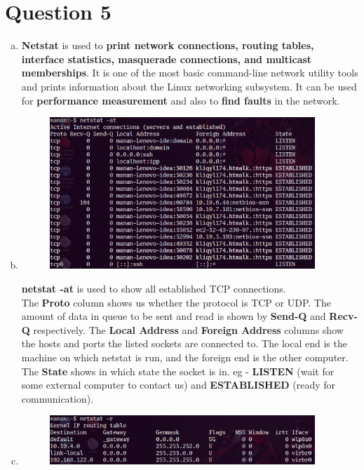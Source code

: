\documentclass[a4paper,10pt]{article}
\newlength{\strutheight}
\begin{document}
\section*{Question 5}
\begin{enumerate}[a)]
	\item \textbf{Netstat} is used to \textbf{print network connections, routing tables, interface statistics, masquerade connections, and multicast memberships}. It is one of the most basic command-line network utility tools and prints information about the Linux networking subsystem. It can be used for \textbf{performance measurement} and also to \textbf{find faults} in the network.
	\item 
	\begin{adjustbox}{valign=T,raise=\strutheight,minipage={\linewidth}}
		\begin{figure}
			\includegraphics[width=10cm]{netstat1.png}
		\end{figure}
		\strut{}
		\textbf{netstat -at} is used to show all established TCP connections. \\
		The \textbf{Proto} column shows us whether the protocol is TCP or UDP. The amount of data in queue to be sent and read is shown by \textbf{Send-Q} and \textbf{Recv-Q} respectively. The \textbf{Local Address} and \textbf{Foreign Address} columns show the hosts and ports the listed sockets are connected to. The local end is the machine on which netstat is run, and the foreign end is the other computer. The \textbf{State} shows in which state the socket is in. eg - \textbf{LISTEN} (wait for some external computer to contact us) and \textbf{ESTABLISHED} (ready for communication).
	\end{adjustbox} 
	\item
	\begin{adjustbox}{valign=T,raise=\strutheight,minipage={\linewidth}}
		\begin{figure}
			\includegraphics[width=10cm]{netstat2.png}

\end{figure}
\end{adjustbox}
\end{enumerate}
\end{document}
